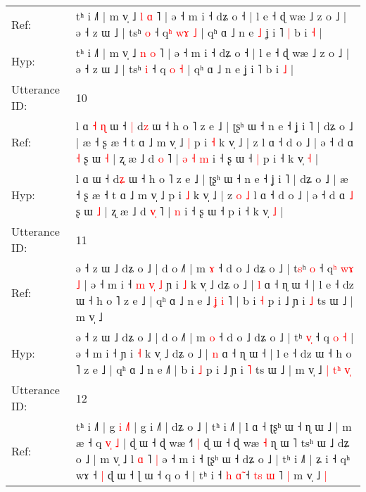 \documentclass[10pt]{article}
\DeclareRobustCommand{\hl}[1]{{\textcolor{red}{#1}}}
\begin{document}
\begin{longtable}{ll}
Ref: & tʰ i ˩˥ | m v̩ ˩ \hl{l} \hl{ɑ} ˥ | ə ˧ m i ˧ dʑ o ˧ | l e ˧ ɖ wæ ˩ z o ˩ | ə ˧ z ɯ ˩ | tsʰ \hl{o} ˧ q\hl{ʰ} \hl{w}\hl{ɤ} \hl{˩} | qʰ ɑ ˩ n e\hl{ }\hl{˩} ʝ i ˥\hl{ }\hl{|} b i \hl{˧} |
 \\
Hyp: & tʰ i ˩˥ | m v̩ ˩ \hl{n} \hl{o} ˥ | ə ˧ m i ˧ dʑ o ˧ | l e ˧ ɖ wæ ˩ z o ˩ | ə ˧ z ɯ ˩ | tsʰ \hl{i} ˧ q\hl{} \hl{}\hl{o} \hl{˧} | qʰ ɑ ˩ n e\hl{}\hl{} ʝ i ˥\hl{}\hl{} b i \hl{˩} |
 \\
\midrule
Utterance ID: & 10 \\
Ref: & l ɑ\hl{ }\hl{˧}\hl{ }\hl{ɳ} ɯ ˧\hl{ }\hl{|} d\hl{z} ɯ ˧ h o ˥ z e ˩ | ʈʂʰ ɯ ˧ n e ˧ ʝ i ˥ | dʑ o ˩ | æ ˧ ʂ æ ˧ t ɑ ˩ m v̩ ˩\hl{ }\hl{|} p i \hl{˧} k v̩ ˩ | z\hl{}\hl{}\hl{}\hl{} l ɑ ˧ d o ˩ | ə ˧ d ɑ \hl{˧} ʂ ɯ \hl{˧} | ʐ æ ˩ d \hl{}\hl{o} ˥ |\hl{ }\hl{ə}\hl{ }\hl{˧} \hl{m} i ˧ ʂ ɯ ˧\hl{ }\hl{|} p i ˧ k v̩ \hl{˧} |
 \\
Hyp: & l ɑ\hl{}\hl{}\hl{}\hl{} ɯ ˧\hl{}\hl{} d\hl{ʑ} ɯ ˧ h o ˥ z e ˩ | ʈʂʰ ɯ ˧ n e ˧ ʝ i ˥ | dʑ o ˩ | æ ˧ ʂ æ ˧ t ɑ ˩ m v̩ ˩\hl{}\hl{} p i \hl{˩} k v̩ ˩ | z\hl{ }\hl{o}\hl{ }\hl{˩} l ɑ ˧ d o ˩ | ə ˧ d ɑ \hl{˩} ʂ ɯ \hl{˩} | ʐ æ ˩ d \hl{v}\hl{̩} ˥ |\hl{}\hl{}\hl{}\hl{} \hl{n} i ˧ ʂ ɯ ˧\hl{}\hl{} p i ˧ k v̩ \hl{˩} |
 \\
\midrule
Utterance ID: & 11 \\
Ref: & ə ˧ z ɯ ˩ dʑ o ˩ | d o ˩˥ | m \hl{ɤ} ˧ d o ˩ dʑ o ˩ | t\hl{s}ʰ \hl{}\hl{o} ˧ q\hl{ʰ} \hl{w}\hl{ɤ} \hl{˩} | ə ˧ m i ˧\hl{ }\hl{m}\hl{ }\hl{v}\hl{̩}\hl{ }\hl{˩} ɲ i \hl{˩} k v̩ ˩ dʑ o ˩ | \hl{l} ɑ ˧ ɳ ɯ ˧ | l e ˧ dz ɯ ˧ h o ˥ z e ˩ | qʰ ɑ ˩ n e ˩\hl{ }\hl{ʝ}\hl{ }\hl{i}\hl{ }˥ | b i \hl{˧} p i ˩ ɲ i \hl{˩} ts ɯ ˩ | m v̩ ˩\hl{}\hl{}\hl{}\hl{}\hl{}\hl{}\hl{}\hl{}
 \\
Hyp: & ə ˧ z ɯ ˩ dʑ o ˩ | d o ˩˥ | m \hl{o} ˧ d o ˩ dʑ o ˩ | t\hl{}ʰ \hl{v}\hl{̩} ˧ q\hl{} \hl{}\hl{o} \hl{˧} | ə ˧ m i ˧\hl{}\hl{}\hl{}\hl{}\hl{}\hl{}\hl{} ɲ i \hl{˧} k v̩ ˩ dʑ o ˩ | \hl{n} ɑ ˧ ɳ ɯ ˧ | l e ˧ dz ɯ ˧ h o ˥ z e ˩ | qʰ ɑ ˩ n e ˩\hl{}\hl{}\hl{}\hl{}\hl{}˥ | b i \hl{˩} p i ˩ ɲ i \hl{˥} ts ɯ ˩ | m v̩ ˩\hl{ }\hl{|}\hl{ }\hl{t}\hl{ʰ}\hl{ }\hl{v}\hl{̩}
 \\
\midrule
Utterance ID: & 12 \\
Ref: & tʰ i ˩˥ | g\hl{}\hl{} \hl{i} \hl{}\hl{˩}˥ | g i ˩˥ | dʑ o ˩ | tʰ i ˩˥ | l ɑ ˧ ʈʂʰ ɯ ˧ ɳ ɯ ˩ | m æ ˧ q \hl{v}\hl{̩} \hl{˩} | ɖ ɯ ˧ ɖ wæ ˧˥\hl{ }\hl{|} ɖ ɯ ˧ ɖ wæ \hl{˧} ɳ ɯ ˥\hl{}\hl{} tsʰ ɯ ˩ dʑ o ˩ | m v̩ ˩ l \hl{ɑ} ˥\hl{ }\hl{|} ə ˧ m i ˧ ʈʂʰ ɯ ˧ dʑ o ˩ | tʰ i ˩˥ | ʑ i ˧ qʰ wɤ ˧\hl{ }\hl{|} ɖ ɯ ˧ ɭ ɯ ˧ q o ˧ | tʰ i ˧ \hl{h} \hl{ɑ}\hl{̃} ˧ \hl{t}\hl{s} \hl{ɯ} ˥\hl{ }\hl{|} m v̩ ˩\hl{ }\hl{|}

\end{longtable}
\end{document}
